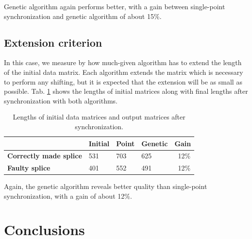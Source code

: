 \documentclass[applsci,article,preprint,moreauthors,pdftex]{Definitions/mdpi}
\begin{document}
Genetic algorithm again performs better, with a gain between single-point synchronization and genetic algorithm of about 15\%.

\subsection{Extension criterion}

In this case, we measure by how much-given algorithm has to extend the length of the initial data matrix. Each algorithm extends the matrix which is necessary to perform any shifting, but it is expected that the extension will be as small as possible. Tab. \ref{tab:tab4} shows the lengths of initial matrices along with final lengths after synchronization with both algorithms.

\begin{table}[ht!]
    \centering
    \caption{Lengths of initial data matrices and output matrices after synchronization.}
    \begin{tabular}{|l|l|l|l|l|}
    \hline
         & \textbf{Initial} & \textbf{Point} & \textbf{Genetic} & \textbf{Gain} \\ \hline
          \textbf{Correctly made splice} & 531 & 703 & 625 & ~12\% \\ \hline
          \textbf{Faulty splice} & 401 & 552 & 491 & ~12\% \\ 
    \hline
    \end{tabular}
    \label{tab:tab4}
\end{table}

Again, the genetic algorithm reveals better quality than single-point synchronization, with a gain of about 12\%.


\section{Conclusions}
\end{document}
